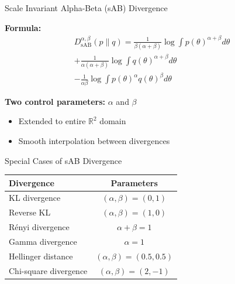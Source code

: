 \documentclass{beamer}
\theoremstyle{definition}
\theoremstyle{plain}
\begin{document}
\begin{frame}{Scale Invariant Alpha-Beta (sAB) Divergence}

\textbf{Formula:}
\begin{multline*}
D^{\alpha,\beta}_{\text{sAB}}(p\|q) = \frac{1}{\beta(\alpha+\beta)} \log \int p(\theta)^{\alpha+\beta} d\theta \\
+ \frac{1}{\alpha(\alpha+\beta)} \log \int q(\theta)^{\alpha+\beta} d\theta \\
- \frac{1}{\alpha\beta} \log \int p(\theta)^{\alpha} q(\theta)^{\beta} d\theta
\end{multline*}

\vspace{0.3cm}

\textbf{Two control parameters:} $\alpha$ and $\beta$
\begin{itemize}
    \item Extended to entire $\mathbb{R}^2$ domain
    \item Smooth interpolation between divergences
\end{itemize}

\end{frame}
\begin{frame}{Special Cases of sAB Divergence}

\begin{table}[]
\centering
\begin{tabular}{|l|c|}
\hline
\textbf{Divergence} & \textbf{Parameters} \\
\hline
KL divergence & $(\alpha, \beta) = (0, 1)$ \\
\hline
Reverse KL & $(\alpha, \beta) = (1, 0)$ \\
\hline
Rényi divergence & $\alpha + \beta = 1$ \\
\hline
Gamma divergence & $\alpha = 1$ \\
\hline
Hellinger distance & $(\alpha, \beta) = (0.5, 0.5)$ \\
\hline
Chi-square divergence & $(\alpha, \beta) = (2, -1)$ \\
\hline
\end{tabular}
\end{table}

\vspace{0.3cm}

\end{frame}
\end{document}
